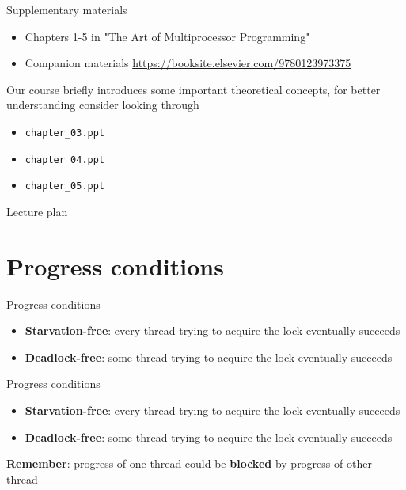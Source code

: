 \begin{frame}[t]{Supplementary materials}

\begin{itemize}
  \item Chapters 1-5 in "The Art of Multiprocessor Programming" 
  \item Companion materials \url{https://booksite.elsevier.com/9780123973375}
\end{itemize}

Our course briefly introduces some important theoretical concepts, for better understanding consider looking through
\begin{itemize}
  \item \texttt{chapter\_03.ppt}  
  \item \texttt{chapter\_04.ppt}
  \item \texttt{chapter\_05.ppt}
\end{itemize}

\end{frame}


\begin{frame}{Lecture plan}
\tableofcontents
\end{frame}


\section{Progress conditions}

\begin{frame}[t]{Progress conditions}

\begin{itemize}

  \item \textbf{Starvation-free}: every thread trying to acquire the lock eventually succeeds
  \item \textbf{Deadlock-free}: some thread trying to acquire the lock eventually succeeds
  
\end{itemize}
\end{frame}



\begin{frame}[t,noframenumbering]{Progress conditions}

\begin{itemize}
  \item \textbf{Starvation-free}: every thread trying to acquire the lock eventually succeeds
  \item \textbf{Deadlock-free}: some thread trying to acquire the lock eventually succeeds
\end{itemize}

\textbf{Remember}: progress of one thread could be \textbf{blocked} by progress of other thread

\end{frame}


